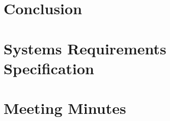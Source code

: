 \documentclass[12pt]{report}
\begin{document}
\chapter{Conclusion}




\begin{appendices}

\chapter{Systems Requirements Specification}


\chapter{Meeting Minutes}


\end{appendices}

% 
% 
\printbibliography
\end{document}
